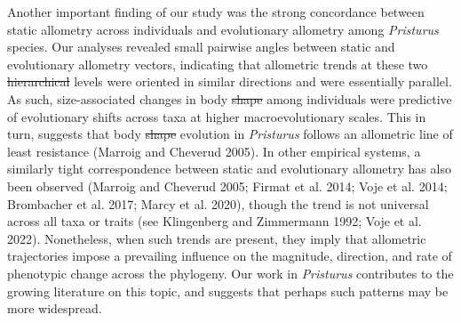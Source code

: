 \documentclass[
  11pt,
]{article}
\providecommand{\DIFaddtex}[1]{{\protect\color{blue}\uwave{#1}}} %
\providecommand{\DIFdeltex}[1]{{\protect\color{red}\sout{#1}}}                      %
\providecommand{\DIFaddbegin}{} %
\providecommand{\DIFaddend}{} %
\providecommand{\DIFdelbegin}{} %
\providecommand{\DIFdelend}{} %
\providecommand{\DIFadd}[1]{\texorpdfstring{\DIFaddtex{#1}}{#1}} %
\providecommand{\DIFdel}[1]{\texorpdfstring{\DIFdeltex{#1}}{}} %
\newcommand{\DIFscaledelfig}{0.5}
\newlength{\DIFdelgraphicswidth} %
\newlength{\DIFdelgraphicsheight} %
\newcommand{\DIFaddincludegraphics}[2][]{{\color{blue}\fbox{\DIFOincludegraphics[#1]{#2}}}} %
\newcommand{\DIFdelincludegraphics}[2][]{%
\sbox{\DIFdelgraphicsbox}{\DIFOincludegraphics[#1]{#2}}%
\settoboxwidth{\DIFdelgraphicswidth}{\DIFdelgraphicsbox} %
\settoboxtotalheight{\DIFdelgraphicsheight}{\DIFdelgraphicsbox} %
\scalebox{\DIFscaledelfig}{%
\parbox[b]{\DIFdelgraphicswidth}{\usebox{\DIFdelgraphicsbox}\\[-\baselineskip] \rule{\DIFdelgraphicswidth}{0em}}\llap{\resizebox{\DIFdelgraphicswidth}{\DIFdelgraphicsheight}{%
\setlength{\unitlength}{\DIFdelgraphicswidth}%
\begin{picture}(1,1)%
\thicklines\linethickness{2pt} %
{\color[rgb]{1,0,0}\put(0,0){\framebox(1,1){}}}%
{\color[rgb]{1,0,0}\put(0,0){\line( 1,1){1}}}%
{\color[rgb]{1,0,0}\put(0,1){\line(1,-1){1}}}%
\end{picture}%
}\hspace*{3pt}}} %
} %
\DeclareRobustCommand{\DIFaddbegin}{\DIFOaddbegin \let\includegraphics\DIFaddincludegraphics} %
\DeclareRobustCommand{\DIFaddend}{\DIFOaddend \let\includegraphics\DIFOincludegraphics} %
\DeclareRobustCommand{\DIFdelbegin}{\DIFOdelbegin \let\includegraphics\DIFdelincludegraphics} %
\DeclareRobustCommand{\DIFdelend}{\DIFOaddend \let\includegraphics\DIFOincludegraphics} %
\begin{document}
Another important finding of our study was the strong concordance
between static allometry across individuals and evolutionary allometry
among \emph{Pristurus} species. Our analyses revealed small pairwise
angles between static and evolutionary allometry vectors, indicating
that allometric trends at these two \DIFdelbegin \DIFdel{hierarchical }\DIFdelend levels were oriented in similar
directions and were essentially parallel. As such, size-associated
changes in body \DIFdelbegin \DIFdel{shape }\DIFdelend \DIFaddbegin \DIFadd{form }\DIFaddend among individuals were predictive of evolutionary
shifts across taxa at higher macroevolutionary scales. This in turn,
suggests that body \DIFdelbegin \DIFdel{shape }\DIFdelend \DIFaddbegin \DIFadd{form }\DIFaddend evolution in \emph{Pristurus} follows an
allometric line of least resistance (Marroig and Cheverud 2005). In
other empirical systems, a similarly tight correspondence between static
and evolutionary allometry has also been observed (Marroig and Cheverud
2005; Firmat et al. 2014; Voje et al. 2014; Brombacher et al. 2017;
Marcy et al. 2020), though the trend is not universal across all taxa or
traits (see Klingenberg and Zimmermann 1992; Voje et al. 2022).
Nonetheless, when such trends are present, they imply that allometric
trajectories impose a prevailing influence on the magnitude, direction,
and rate of phenotypic change across the phylogeny. Our work in
\emph{Pristurus} contributes to the growing literature on this topic,
and suggests that perhaps such patterns may be more
widespread.\hfill\break
\end{document}
